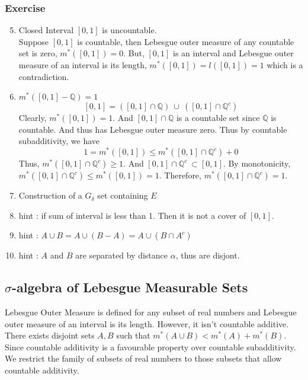 \subsubsection{Exercise}
\begin{enumerate}
	\setcounter{enumi}{4}
\item Closed Interval $[0,1]$ is uncountable.\\
	Suppose $[0,1]$ is countable, then Lebesgue outer measure of any countable set is zero, $m^\ast([0,1]) = 0$.
		But, $[0,1]$ is an interval and Lebesgue outer measure of an interval is its length, $m^\ast([0,1]) = l([0,1]) = 1$ which is a contradiction.
\item $m^\ast([0,1] - \mathbb{Q}) = 1$
	\[ [0,1] = \left( [0,1] \cap \mathbb{Q} \right)\ \cup\ \left( [0,1]\cap \mathbb{Q}^c \right) \]
	Clearly, $m^\ast([0,1]) = 1$.
		And $[0,1] \cap \mathbb{Q}$ is a countable set since $\mathbb{Q}$ is countable.
		And thus has Lebesgue outer measure zero.
		Thus by countable subadditivity, we have
		\[ 1 = m^\ast([0,1]) \le m^\ast([0,1] \cap \mathbb{Q}^c) + 0 \]
		Thus, $m^\ast([0,1] \cap \mathbb{Q}^c) \ge 1$.
		And $[0,1] \cap \mathbb{Q}^c\ \subset [0,1]$.
		By monotonicity, $m^\ast([0,1] \cap \mathbb{Q}^c) \le m^\ast([0,1]) = 1$.
		Therefore, $m^\ast([0,1] \cap \mathbb{Q}^c) = 1$.
	\item Construction of a $G_\delta$ set containing $E$ %
	\item hint : if sum of interval is less than 1.
		Then it is not a cover of $[0,1]$.
	\item hint : $A \cup B = A \cup (B-A) = A \cup (B \cap A^c)$
	\item hint : $A$ and $B$ are separated by distance $\alpha$, thus are disjont.
\end{enumerate}

\subsection{$\sigma$-algebra of Lebesgue Measurable Sets}
	Lebesgue Outer Measure is defined for any subset of real numbers and Lebesgue outer measure of an interval is its length.
	However, it isn't countable additive.\\

	There exists disjoint sets $A,B$ such that $m^\ast(A\cup B) < m^\ast(A)+m^\ast(B)$.\\
	
	Since countable additivity is a favourable property over countable subadditivity.
	We restrict the family of subsets of real numbers to those subsets that allow countable additivity.
	

